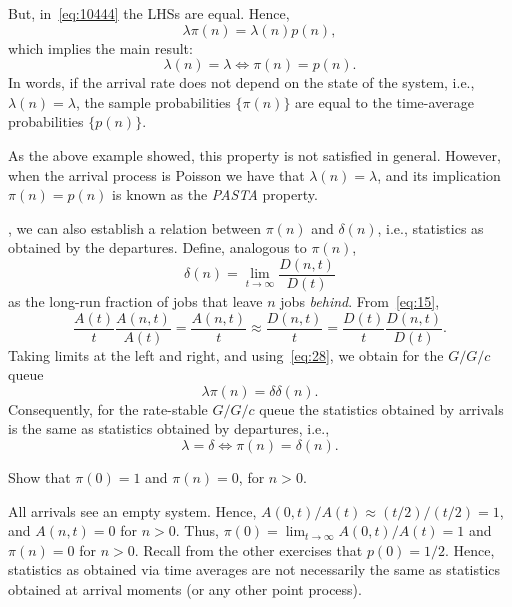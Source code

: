 But, in~\cref{eq:10444} the LHSs are equal. Hence, 
\begin{equation}\label{eq:13}
\lambda \pi(n) = \lambda(n) p(n),
\end{equation}
which implies the main result:
\begin{equation*}
 \lambda(n) = \lambda \iff \pi(n) = p(n).
\end{equation*}
In words,  if the arrival rate does not depend on the state of the system, i.e., $\lambda(n)=\lambda$, the sample probabilities $\{\pi(n)\}$ are equal to the time-average probabilities $\{p(n)\}$.

As the above example showed, this property is not satisfied in general.
However, when the arrival process is Poisson we have that $\lambda(n)=\lambda$, and its implication $\pi(n)=p(n)$ is known as the \emph{PASTA} property.


, we can also establish a relation between $\pi(n)$ and $\delta(n)$, i.e.,  statistics as obtained by the departures.
Define, analogous to $\pi(n)$, 
\begin{equation*}
 \delta(n) = \lim_{t\to\infty} \frac{D(n,t)}{D(t)}
\end{equation*}
as the long-run fraction of jobs that leave $n$ jobs \emph{behind}.
From~\cref{eq:15},
\begin{equation*}
\frac{A(t)}t \frac{A(n,t)}{A(t)} = \frac{A(n,t)}t \approx \frac{D(n,t)}t 
= \frac{D(t)}t \frac{D(n,t)}{D(t)}.
\end{equation*}
Taking limits at the left and right, and using~\cref{eq:28}, we obtain for the $G/G/c$ queue
\begin{equation} \label{eq:36}
 \lambda \pi(n) = \delta \delta(n).
\end{equation}
Consequently, for the  rate-stable $G/G/c$ queue  the statistics obtained by arrivals is the same as statistics obtained by departures, i.e., 
\begin{equation} \label{eq:39}
\lambda = \delta \iff \pi(n) = \delta(n).
\end{equation}

\begin{exercise}\label{ex:8} 
Show that $\pi(0)=1$ and $\pi(n)=0$, for $n>0$.
\begin{solution}
  All arrivals see an empty system.
  Hence, $A(0,t)/A(t) \approx (t/2)/(t/2) = 1$, and $A(n,t)=0$ for $n>0$.
  Thus, $\pi(0) = \lim_{t\to\infty} A(0,t)/A(t) = 1$ and $\pi(n)=0$ for $n>0$.
  Recall from the other exercises that $p(0)=1/2$.
  Hence, statistics as obtained via time averages are not necessarily the same as statistics obtained at arrival moments (or any other point process).
\end{solution}

\end{exercise}

